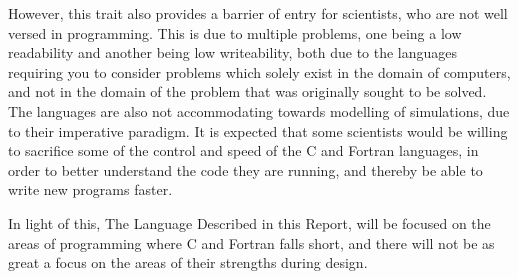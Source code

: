 However, this trait also provides a barrier of entry for scientists, who are not well versed in programming. This is due to multiple problems, one being a low readability and another being low writeability, both due to the languages requiring you to consider problems which solely exist in the domain of computers, and not in the domain of the problem that was originally sought to be solved. The languages are also not accommodating towards modelling of simulations, due to their imperative paradigm. It is expected that some scientists would be willing to sacrifice some of the control and speed of the C and Fortran languages, in order to better understand the code they are running, and thereby be able to write new programs faster.

In light of this, The Language Described in this Report, will be focused on the areas of programming where C and Fortran falls short, and there will not be as great a focus on the areas of their strengths during design.